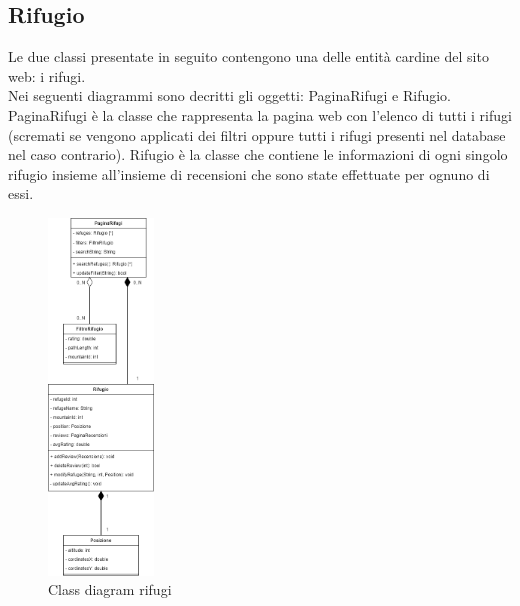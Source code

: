 \documentclass[a4paper,12pt]{article}
\begin{document}
\subsection{Rifugio}
Le due classi presentate in seguito contengono una delle entità cardine del sito web: i rifugi.
\\ Nei seguenti diagrammi sono decritti gli oggetti: PaginaRifugi e Rifugio.
\\ PaginaRifugi è la classe che rappresenta la pagina web con l'elenco di tutti i rifugi (scremati se vengono applicati dei filtri oppure tutti i rifugi presenti nel database nel caso contrario). Rifugio  è la classe che contiene le informazioni di ogni singolo rifugio insieme all'insieme di recensioni che sono state effettuate per ognuno di essi.
\begin{figure}[H]
   \centering
   \includegraphics[width=0.25\textwidth] {D3/img/class_diagram_refuges.png}
    \caption{Class diagram rifugi}
\end{figure}
\newpage
\end{document}
